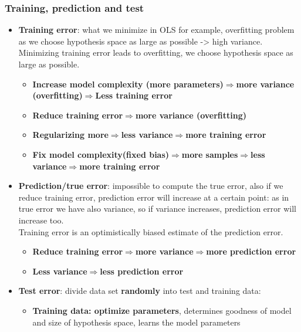 \subsubsection{Training, prediction and test}
    \begin{itemize}
        \item \textbf{Training error}: what we minimize in OLS for example, overfitting problem as we choose hypothesis space as large as possible -> high variance.\\
        Minimizing training error leads to overfitting, we choose hypothesis space as large as possible.
        \begin{itemize}
            \item \textbf{Increase model complexity (more parameters)$\Rightarrow$more variance (overfitting)$\Rightarrow$Less training error}
            \item \textbf{Reduce training error$\Rightarrow$more variance (overfitting)}
            \item \textbf{Regularizing more$\Rightarrow$less variance$\Rightarrow$more training error}
            \item \textbf{Fix model complexity(fixed bias)$\Rightarrow$more samples$\Rightarrow$less variance$\Rightarrow$more training error}
        \end{itemize}
        \item \textbf{Prediction/true error}: impossible to compute the true error, also if we reduce training error, prediction error will increase at a certain point: as in true error we have also variance, so if variance increases, prediction error will increase too.\\
        Training error is an optimistically biased estimate of the prediction error.
        \begin{itemize}
            \item \textbf{Reduce training error$\Rightarrow$more variance$\Rightarrow$more prediction error}
            \item \textbf{Less variance$\Rightarrow$less prediction error}
        \end{itemize}
        \item \textbf{Test error}: divide data set \textbf{randomly} into test and training data:
        \begin{itemize}
            \item \textbf{Training data: optimize parameters}, determines goodness of model and size of hypothesis space, learns the model parameters

\end{itemize}
\end{itemize}

